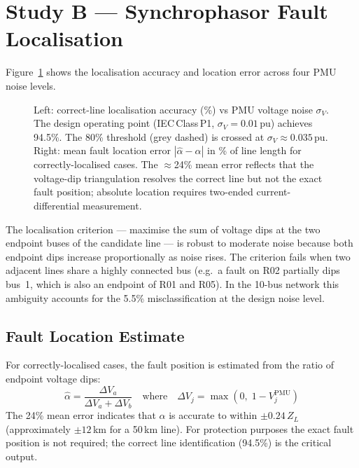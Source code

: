 \documentclass[11pt,a4paper]{article}
\begin{document}
\section{Study B --- Synchrophasor Fault Localisation}
\label{sec:studyB}

Figure~\ref{fig:localisation} shows the localisation accuracy and location
error across four PMU noise levels.

\begin{figure}[htbp]
  \centering
  \resizebox{0.96\textwidth}{!}{}
  \caption{Left: correct-line localisation accuracy (\%) vs PMU voltage noise
           $\sigma_V$.  The design operating point (IEC\,Class\,P1,
           $\sigma_V=0.01$\,pu) achieves 94.5\%.  The 80\% threshold (grey
           dashed) is crossed at $\sigma_V\approx0.035$\,pu.  Right: mean
           fault location error $|\hat\alpha-\alpha|$ in \% of line length for
           correctly-localised cases.  The $\approx$24\% mean error reflects
           that the voltage-dip triangulation resolves the correct line but
           not the exact fault position; absolute location requires two-ended
           current-differential measurement.}
  \label{fig:localisation}
\end{figure}

\noindent
The localisation criterion — maximise the sum of voltage dips at the two
endpoint buses of the candidate line — is robust to moderate noise because
both endpoint dips increase proportionally as noise rises.  The criterion
fails when two adjacent lines share a highly connected bus (e.g.\ a fault
on R02 partially dips bus~1, which is also an endpoint of R01 and R05).
In the 10-bus network this ambiguity accounts for the 5.5\% misclassification
at the design noise level.

\subsection*{Fault Location Estimate}

For correctly-localised cases, the fault position is estimated from the ratio
of endpoint voltage dips:
\begin{equation}
  \hat\alpha = \frac{\Delta V_a}{\Delta V_a + \Delta V_b}
  \quad\text{where}\quad
  \Delta V_j = \max(0,\; 1 - V_j^\mathrm{PMU})
\end{equation}
The 24\% mean error indicates that $\hat\alpha$ is accurate to within
$\pm0.24\,Z_L$ (approximately $\pm12$\,km for a 50\,km line).  For protection
purposes the exact fault position is not required; the correct line
identification (94.5\%) is the critical output.
\end{document}
